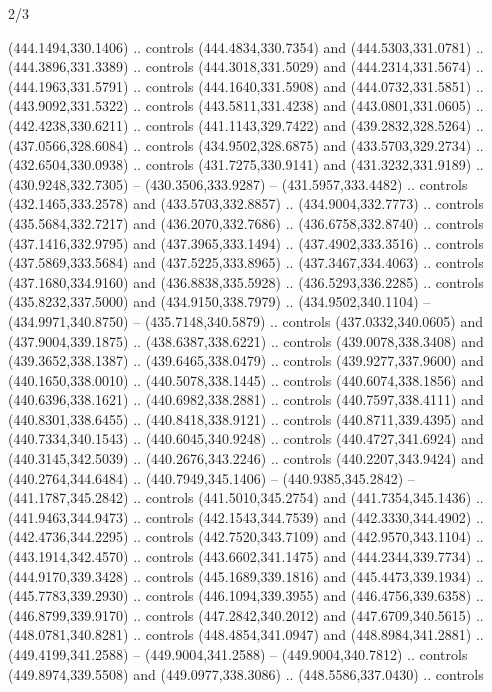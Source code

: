 \begin{flagdescription}{2/3}
\begin{scope}[xshift=0.5\flaglength,yshift=0.5\flagwidth,scale=\flagwidth/495.65]
\begin{scope}[y=0.8pt, x=0.8pt, yscale=-1,shift={(-463.76,-309.78)}]
  (444.1494,330.1406) .. controls (444.4834,330.7354) and (444.5303,331.0781) ..
  (444.3896,331.3389) .. controls (444.3018,331.5029) and (444.2314,331.5674) ..
  (444.1963,331.5791) .. controls (444.1640,331.5908) and (444.0732,331.5851) ..
  (443.9092,331.5322) .. controls (443.5811,331.4238) and (443.0801,331.0605) ..
  (442.4238,330.6211) .. controls (441.1143,329.7422) and (439.2832,328.5264) ..
  (437.0566,328.6084) .. controls (434.9502,328.6875) and (433.5703,329.2734) ..
  (432.6504,330.0938) .. controls (431.7275,330.9141) and (431.3232,331.9189) ..
  (430.9248,332.7305) -- (430.3506,333.9287) -- (431.5957,333.4482) .. controls
  (432.1465,333.2578) and (433.5703,332.8857) .. (434.9004,332.7773) .. controls
  (435.5684,332.7217) and (436.2070,332.7686) .. (436.6758,332.8740) .. controls
  (437.1416,332.9795) and (437.3965,333.1494) .. (437.4902,333.3516) .. controls
  (437.5869,333.5684) and (437.5225,333.8965) .. (437.3467,334.4063) .. controls
  (437.1680,334.9160) and (436.8838,335.5928) .. (436.5293,336.2285) .. controls
  (435.8232,337.5000) and (434.9150,338.7979) .. (434.9502,340.1104) --
  (434.9971,340.8750) -- (435.7148,340.5879) .. controls (437.0332,340.0605) and
  (437.9004,339.1875) .. (438.6387,338.6221) .. controls (439.0078,338.3408) and
  (439.3652,338.1387) .. (439.6465,338.0479) .. controls (439.9277,337.9600) and
  (440.1650,338.0010) .. (440.5078,338.1445) .. controls (440.6074,338.1856) and
  (440.6396,338.1621) .. (440.6982,338.2881) .. controls (440.7597,338.4111) and
  (440.8301,338.6455) .. (440.8418,338.9121) .. controls (440.8711,339.4395) and
  (440.7334,340.1543) .. (440.6045,340.9248) .. controls (440.4727,341.6924) and
  (440.3145,342.5039) .. (440.2676,343.2246) .. controls (440.2207,343.9424) and
  (440.2764,344.6484) .. (440.7949,345.1406) -- (440.9385,345.2842) --
  (441.1787,345.2842) .. controls (441.5010,345.2754) and (441.7354,345.1436) ..
  (441.9463,344.9473) .. controls (442.1543,344.7539) and (442.3330,344.4902) ..
  (442.4736,344.2295) .. controls (442.7520,343.7109) and (442.9570,343.1104) ..
  (443.1914,342.4570) .. controls (443.6602,341.1475) and (444.2344,339.7734) ..
  (444.9170,339.3428) .. controls (445.1689,339.1816) and (445.4473,339.1934) ..
  (445.7783,339.2930) .. controls (446.1094,339.3955) and (446.4756,339.6358) ..
  (446.8799,339.9170) .. controls (447.2842,340.2012) and (447.6709,340.5615) ..
  (448.0781,340.8281) .. controls (448.4854,341.0947) and (448.8984,341.2881) ..
  (449.4199,341.2588) -- (449.9004,341.2588) -- (449.9004,340.7812) .. controls
  (449.8974,339.5508) and (449.0977,338.3086) .. (448.5586,337.0430) .. controls

\end{scope}
\end{scope}
\end{flagdescription}
